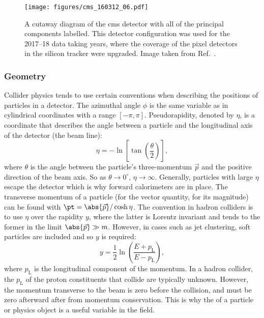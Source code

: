 \clearpage

\begin{figure}[htbp]
    \centering
    \texttt{[image: figures/cms\_160312\_06.pdf]}
    \caption[A cutaway diagram of the CMS detector for the 2017--18 data taking years, with all of the principal components labelled]{A cutaway diagram of the \acrshort{cms} detector with all of the principal components labelled. This detector configuration was used for the 2017--18 data taking years, where the coverage of the pixel detectors in the silicon tracker were upgraded. Image taken from Ref.~.}
    \label{fig:detector_cms_cutaway}
\end{figure}




\subsubsection{Geometry}
\label{subsubsec:geometry}

Collider physics tends to use certain conventions when describing the positions of particles in a detector. The azimuthal angle $\phi$ is the same variable as in cylindrical coordinates with a range $[-\pi, \pi]$. Pseudorapidity, denoted by $\eta$, is a coordinate that describes the angle between a particle and the longitudinal axis of the detector (the beam line):
\begin{equation}
    \eta = -\ln \left[ \tan(\frac{\theta}{2}) \right],
    \label{eq:eta_def}
\end{equation}
where $\theta$ is the angle between the particle's three-momentum $\vec{p}$ and the positive direction of the beam axis. So as $\theta \rightarrow \text{0}^{\circ}$, $\eta \rightarrow \infty$. Generally, particles with large $\eta$ escape the detector which is why forward calorimeters are in place. The transverse momentum of a particle (\ptvec for the vector quantity, \pt for its magnitude) can be found with $\pt = \abs{\vec{p}} / \cosh \eta$. The convention in hadron colliders is to use $\eta$ over the rapidity $y$, where the latter is Lorentz invariant and tends to the former in the limit $\abs{\vec{p}} \gg m$. However, in cases such as jet clustering, soft particles are included and so $y$ is required:
\begin{equation}
    y = \frac{1}{2} \ln (\frac{ E + p_{\mathrm{L}} }{ E - p_{\mathrm{L}} }),
    \label{eq:rapidity_def}
\end{equation}
where $p_{\mathrm{L}}$ is the longitudinal component of the momentum. In a hadron collider, the $p_{\mathrm{L}}$ of the proton constituents that collide are typically unknown. However, the momentum transverse to the beam is zero before the collision, and must be zero afterward after from momentum conservation. This is why the \ptvec of a particle or physics object is a useful variable in the field.

